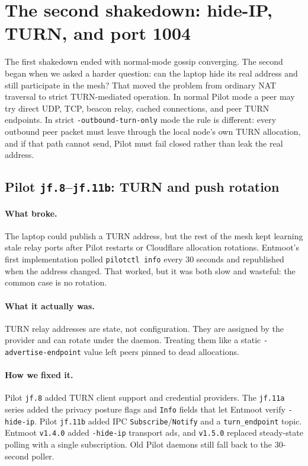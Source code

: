 \documentclass[11pt,a4paper]{article}
\begin{document}
\section{The second shakedown: hide-IP, TURN, and port 1004}
\label{sec:secondshakedown}

The first shakedown ended with normal-mode gossip converging. The
second began when we asked a harder question: can the laptop hide its
real address and still participate in the mesh? That moved the problem
from ordinary NAT traversal to strict TURN-mediated operation. In
normal Pilot mode a peer may try direct UDP, TCP, beacon relay, cached
connections, and peer TURN endpoints. In strict
\texttt{-outbound-turn-only} mode the rule is different: every
outbound peer packet must leave through the local node's own TURN
allocation, and if that path cannot send, Pilot must fail closed rather
than leak the real address.

\subsection{Pilot \texttt{jf.8}--\texttt{jf.11b}: TURN and push
rotation}

\paragraph{What broke.} The laptop could publish a TURN address, but
the rest of the mesh kept learning stale relay ports after Pilot
restarts or Cloudflare allocation rotations. Entmoot's first
implementation polled \texttt{pilotctl info} every 30 seconds and
republished when the address changed. That worked, but it was both
slow and wasteful: the common case is no rotation.

\paragraph{What it actually was.} TURN relay addresses are state, not
configuration. They are assigned by the provider and can rotate under
the daemon. Treating them like a static \texttt{-advertise-endpoint}
value left peers pinned to dead allocations.

\paragraph{How we fixed it.} Pilot \texttt{jf.8} added TURN client
support and credential providers. The \texttt{jf.11a} series added the
privacy posture flags and \texttt{Info} fields that let Entmoot verify
\texttt{-hide-ip}. Pilot \texttt{jf.11b} added IPC
\texttt{Subscribe}/\texttt{Notify} and a \texttt{turn\_endpoint} topic.
Entmoot \texttt{v1.4.0} added \texttt{-hide-ip} transport ads, and
\texttt{v1.5.0} replaced steady-state polling with a single
subscription. Old Pilot daemons still fall back to the 30-second poller.
\end{document}
